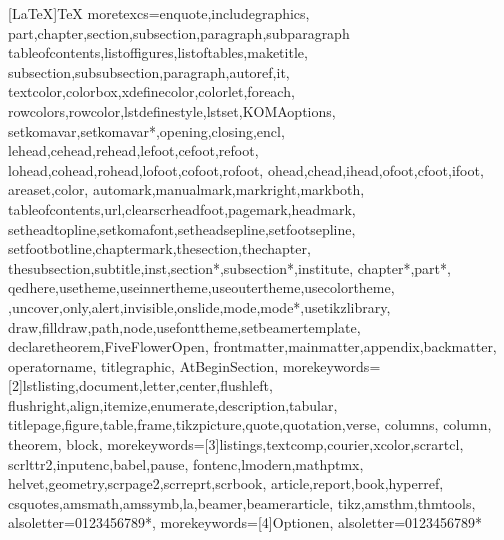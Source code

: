 [LaTeX]{TeX}%
  {moretexcs={enquote,includegraphics,%
    part,chapter,section,subsection,paragraph,subparagraph%
    tableofcontents,listoffigures,listoftables,maketitle,%
    subsection,subsubsection,paragraph,autoref,it,%
    textcolor,colorbox,xdefinecolor,colorlet,foreach,%
    rowcolors,rowcolor,lstdefinestyle,lstset,KOMAoptions,%
    setkomavar,setkomavar*,opening,closing,encl,%
    lehead,cehead,rehead,lefoot,cefoot,refoot,%
    lohead,cohead,rohead,lofoot,cofoot,rofoot,%
    ohead,chead,ihead,ofoot,cfoot,ifoot,%
    areaset,color,%
    automark,manualmark,markright,markboth,%
    tableofcontents,url,clearscrheadfoot,pagemark,headmark,%
    setheadtopline,setkomafont,setheadsepline,setfootsepline,%
    setfootbotline,chaptermark,thesection,thechapter,%
    thesubsection,subtitle,inst,section*,subsection*,institute,%
    chapter*,part*,%
    qedhere,usetheme,useinnertheme,useoutertheme,usecolortheme,%
    ,uncover,only,alert,invisible,onslide,mode,mode*,usetikzlibrary,%
    draw,filldraw,path,node,usefonttheme,setbeamertemplate,%
    declaretheorem,FiveFlowerOpen,%
    frontmatter,mainmatter,appendix,backmatter,%
    operatorname, titlegraphic, AtBeginSection},%
  morekeywords={[2]lstlisting,document,letter,center,flushleft,%
    flushright,align,itemize,enumerate,description,tabular,%
    titlepage,figure,table,frame,tikzpicture,quote,quotation,verse, 
    columns, column, theorem, block},%
  morekeywords={[3]listings,textcomp,courier,xcolor,scrartcl,%
    scrlttr2,inputenc,babel,pause,%
    fontenc,lmodern,mathptmx,%
    helvet,geometry,scrpage2,scrreprt,scrbook,%
    article,report,book,hyperref,%
    csquotes,amsmath,amssymb,la,beamer,beamerarticle,%
    tikz,amsthm,thmtools},
  alsoletter={0123456789*},
  morekeywords={[4]Optionen},
  alsoletter={0123456789*}
  }%



